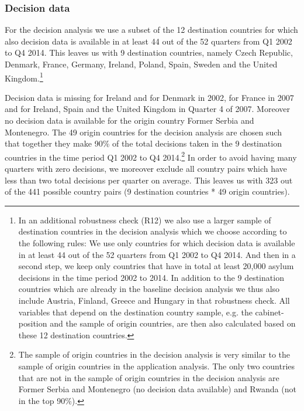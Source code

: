 \documentclass[11pt,a4paper]{scrartcl}
\begin{document}
\subsubsection{Decision data}
For the decision analysis we use a subset of the 12 destination countries for which also decision data is available in at least 44 out of the 52 quarters from Q1 2002 to Q4 2014. This leaves us with 9 destination countries, namely Czech Republic, Denmark, France, Germany, Ireland, Poland, Spain, Sweden and the United Kingdom.\footnote{In an additional robustness check (R12) we also use a larger sample of destination countries in the decision analysis which we choose according to the following rules: We use only countries for which decision data is available in at least 44 out of the 52 quarters from Q1 2002 to Q4 2014. And then in a second step, we keep only countries that have in total at least 20,000 asylum decisions in the time period 2002 to 2014. In addition to the 9 destination countries which are already in the baseline decision analysis we thus also include Austria, Finland, Greece and Hungary in that robustness check. All variables that depend on the destination country sample, e.g. the cabinet-position and the sample of origin countries, are then also calculated based on these 12 destination countries.}

Decision data is missing for Ireland and for Denmark in 2002, for France in 2007 and for Ireland, Spain and the United Kingdom in Quarter 4 of 2007. Moreover no decision data is available for the origin country Former Serbia and Montenegro. The 49 origin countries for the decision analysis are chosen such that together they make 90\% of the total decisions taken in the 9 destination countries in the time period Q1 2002 to Q4 2014.\footnote{The sample of origin countries in the decision analysis is very similar to the sample of origin countries in the application analysis. The only two countries that are not in the sample of origin countries in the decision analysis are Former Serbia and Montenegro (no decision data available) and Rwanda (not in the top 90\%).} In order to avoid having many quarters with zero decisions, we moreover exclude all country pairs which have less than two total decisions per quarter on average. This leaves us with 323 out of the 441 possible country pairs (9 destination countries * 49 origin countries).
\end{document}

